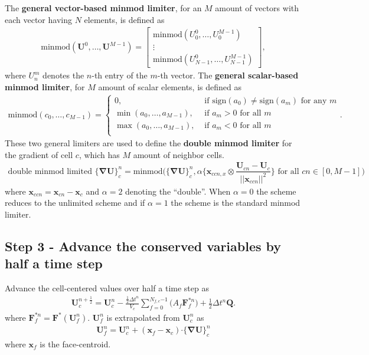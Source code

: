 \documentclass[10pt,letterpaper,notitlepage]{article}
\numberwithin{equation}{section}
\newcommand{\bnabla}{\boldsymbol{\nabla}}
\newcommand{\position}{\mathbf{x}}
\newcommand{\dotp}{\boldsymbol{\cdot}}
\newcommand{\beqn}{\begin{equation}\begin{aligned}}
\newcommand{\eeqn}{\end{aligned}\end{equation}}
\begin{document}
The \textbf{general vector-based minmod limiter}, for an $M$ amount of vectors with each vector having $N$ elements, is defined as
\beqn
\text{minmod}(\mathbf{U}^0, \dots, \mathbf{U}^{M-1}) = 
\begin{bmatrix}
	\text{minmod}(U_0^0, \dots, U_0^{M-1}) \\
	\vdots \\
	\text{minmod}(U_{N-1}^0, \dots, U_{N-1}^{M-1})
\end{bmatrix},
\eeqn 
where $U_n^m$ denotes the $n$-th entry of the $m$-th vector. The \textbf{general scalar-based minmod limiter}, for $M$ amount of scalar elements, is defined as
\beqn 
\text{minmod}(c_0, \dots, c_{M-1}) = 
\begin{cases}
	0, &\text{ if } \text{sign}(a_0) \ne  \text{sign}(a_m) \text{ for any } m \\
	\min(a_0, \dots, a_{M-1}), &\text{ if } a_m > 0 \text{ for all } m \\
	\max(a_0, \dots, a_{M-1}), &\text{ if } a_m < 0 \text{ for all } m \\
\end{cases}.
\eeqn 
These two general limiters are used to define the \textbf{double minmod limiter} for the gradient of cell $c$, which has $M$ amount of neighbor cells.
\beqn 
\text{double minmod limited }\big\{ \bnabla \mathbf{U} \big\}_c^n = 
	\text{minmod}\biggr(
	\big\{ \bnabla \mathbf{U} \big\}_{c}^n,
	\alpha \bigg\{ \position_{ccn,x} \otimes
	\dfrac{\mathbf{U}_{cn} - \mathbf{U}_c}{||\position_{ccn}||^2} \bigg\} \text{ for all } cn\in[0,M-1]
	\biggr) 
\eeqn 
where $\position_{ccn} = \position_{cn} - \position_c$ and $\alpha{=2}$ denoting the ``double''. When $\alpha{=0}$ the scheme reduces to the unlimited scheme and if $\alpha{=1}$ the scheme is the standard minmod limiter.

\newpage
\subsection{Step 3 - Advance the conserved variables by half a time step}
Advance the cell-centered values over half a time step as
\beqn 
\mathbf{U}_c^{n{+}\frac{1}{2}} = \mathbf{U}_c^n - \frac{\frac{1}{2}\Delta t^n}{V_c} \sum_{f=0}^{N_{f,c}{-1}} 
\biggr(
A_f \mathbf{F}_f^{*n}
\biggr)
+ \frac{1}{2}\Delta t^n \mathbf{Q}.
\eeqn 
where $\mathbf{F}_f^{*n} = \mathbf{F}^*(\mathbf{U}_f^n) $. $\mathbf{U}_f^n$ is extrapolated from $\mathbf{U}_c^n$ as
\beqn 
\mathbf{U}_f^{n} = \mathbf{U}_c^{n}  + (\position_{f} - \position_c) \dotp \big\{ \bnabla \mathbf{U} \big\}_c^n
\eeqn 
where $\position_f$ is the face-centroid.
\end{document}

